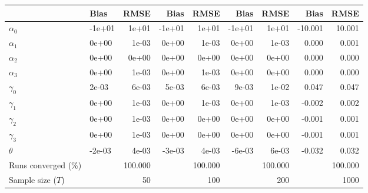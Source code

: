 
\begin{tabular}[t]{llrrrrrrr}
\toprule
  & Bias & RMSE & Bias & RMSE & Bias & RMSE & Bias & RMSE\\
\midrule
$\alpha_{0}$ & -1e+01 & 1e+01 & -1e+01 & 1e+01 & -1e+01 & 1e+01 & -10.001 & 10.001\\
$\alpha_{1}$ & 0e+00 & 1e-03 & 0e+00 & 1e-03 & 0e+00 & 1e-03 & 0.000 & 0.001\\
$\alpha_{2}$ & 0e+00 & 0e+00 & 0e+00 & 0e+00 & 0e+00 & 0e+00 & 0.000 & 0.000\\
$\alpha_{3}$ & 0e+00 & 1e-03 & 0e+00 & 1e-03 & 0e+00 & 0e+00 & 0.000 & 0.000\\
$\gamma_{0}$ & 2e-03 & 6e-03 & 5e-03 & 6e-03 & 9e-03 & 1e-02 & 0.047 & 0.047\\
$\gamma_{1}$ & 0e+00 & 1e-03 & 0e+00 & 1e-03 & 0e+00 & 1e-03 & -0.002 & 0.002\\
$\gamma_{2}$ & 0e+00 & 1e-03 & 0e+00 & 0e+00 & 0e+00 & 0e+00 & -0.001 & 0.001\\
$\gamma_{3}$ & 0e+00 & 1e-03 & 0e+00 & 0e+00 & 0e+00 & 0e+00 & -0.001 & 0.001\\
$\theta$ & -2e-03 & 4e-03 & -3e-03 & 4e-03 & -6e-03 & 6e-03 & -0.032 & 0.032\\
Runs converged (\%) &  & 100.000 &  & 100.000 &  & 100.000 &  & 100.000\\
Sample size ($T$) &  & 50 &  & 100 &  & 200 &  & 1000\\
\bottomrule
\end{tabular}
